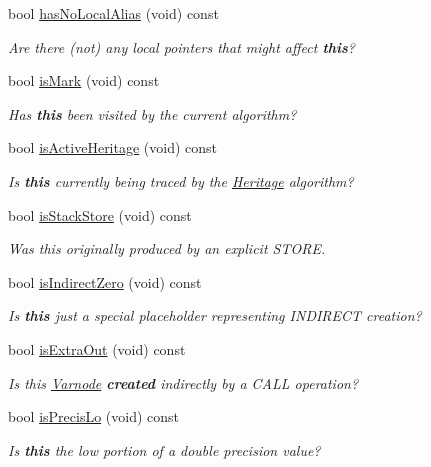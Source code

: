 \begin{DoxyCompactItemize}
bool \mbox{\hyperlink{class_varnode_a3af89619c25ba464f9f1c9e61c8b2d96}{has\+No\+Local\+Alias}} (void) const
\begin{DoxyCompactList}\small\item\em Are there (not) any local pointers that might affect {\bfseries{this}}? \end{DoxyCompactList}\item 
bool \mbox{\hyperlink{class_varnode_a45c802c00e20c46f4d8b15230c5150e0}{is\+Mark}} (void) const
\begin{DoxyCompactList}\small\item\em Has {\bfseries{this}} been visited by the current algorithm? \end{DoxyCompactList}\item 
bool \mbox{\hyperlink{class_varnode_a0ecb41601b665957bd9a832b3455a9be}{is\+Active\+Heritage}} (void) const
\begin{DoxyCompactList}\small\item\em Is {\bfseries{this}} currently being traced by the \mbox{\hyperlink{class_heritage}{Heritage}} algorithm? \end{DoxyCompactList}\item 
bool \mbox{\hyperlink{class_varnode_a517f55e86dd2f2c709bf107ccc088cb4}{is\+Stack\+Store}} (void) const
\begin{DoxyCompactList}\small\item\em Was this originally produced by an explicit S\+T\+O\+RE. \end{DoxyCompactList}\item 
bool \mbox{\hyperlink{class_varnode_abba0a1aed3783ba8fdb8de79fcfe1708}{is\+Indirect\+Zero}} (void) const
\begin{DoxyCompactList}\small\item\em Is {\bfseries{this}} just a special placeholder representing I\+N\+D\+I\+R\+E\+CT creation? \end{DoxyCompactList}\item 
bool \mbox{\hyperlink{class_varnode_a1759575be3f53457006b912a008fc532}{is\+Extra\+Out}} (void) const
\begin{DoxyCompactList}\small\item\em Is this \mbox{\hyperlink{class_varnode}{Varnode}} {\bfseries{created}} indirectly by a C\+A\+LL operation? \end{DoxyCompactList}\item 
bool \mbox{\hyperlink{class_varnode_adf76ea55e1c5b314bd8c4bb0917444b9}{is\+Precis\+Lo}} (void) const
\begin{DoxyCompactList}\small\item\em Is {\bfseries{this}} the low portion of a double precision value? \end{DoxyCompactList}\item 

\end{DoxyCompactItemize}
